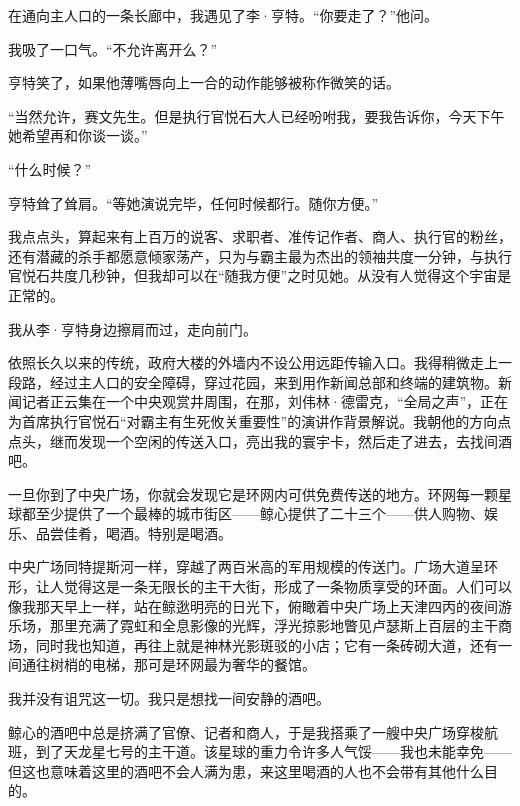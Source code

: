 \documentclass[AutoFakeBold=true]{book}
\begin{document}
\vspace*{1em}

在通向主人口的一条长廊中，我遇见了李·亨特。``你要走了？''他问。

我吸了一口气。``不允许离开么？''

亨特笑了，如果他薄嘴唇向上一合的动作能够被称作微笑的话。

``当然允许，赛文先生。但是执行官悦石大人已经吩咐我，要我告诉你，今天下午她希望再和你谈一谈。''

``什么时候？''

亨特耸了耸肩。``等她演说完毕，任何时候都行。随你方便。''

我点点头，算起来有上百万的说客、求职者、准传记作者、商人、执行官的粉丝，还有潜藏的杀手都愿意倾家荡产，只为与霸主最为杰出的领袖共度一分钟，与执行官悦石共度几秒钟，但我却可以在``随我方便''之时见她。从没有人觉得这个宇宙是正常的。

我从李·亨特身边擦肩而过，走向前门。

\vspace*{1em}

依照长久以来的传统，政府大楼的外墙内不设公用远距传输入口。我得稍微走上一段路，经过主人口的安全障碍，穿过花园，来到用作新闻总部和终端的建筑物。新闻记者正云集在一个中央观赏井周围，在那，刘伟林·德雷克，``全局之声''，正在为首席执行官悦石``对霸主有生死攸关重要性''的演讲作背景解说。我朝他的方向点点头，继而发现一个空闲的传送入口，亮出我的寰宇卡，然后走了进去，去找间酒吧。

\vspace*{1em}

一旦你到了中央广场，你就会发现它是环网内可供免费传送的地方。环网每一颗星球都至少提供了一个最棒的城市街区——鲸心提供了二十三个——供人购物、娱乐、品尝佳肴，喝酒。特别是喝酒。

中央广场同特提斯河一样，穿越了两百米高的军用规模的传送门。广场大道呈环形，让人觉得这是一条无限长的主干大街，形成了一条物质享受的环面。人们可以像我那天早上一样，站在鲸逖明亮的日光下，俯瞰着中央广场上天津四丙的夜间游乐场，那里充满了霓虹和全息影像的光辉，浮光掠影地瞥见卢瑟斯上百层的主干商场，同时我也知道，再往上就是神林光影斑驳的小店；它有一条砖砌大道，还有一间通往树梢的电梯，那可是环网最为奢华的餐馆。

我并没有诅咒这一切。我只是想找一间安静的酒吧。

鲸心的酒吧中总是挤满了官僚、记者和商人，于是我搭乘了一艘中央广场穿梭航班，到了天龙星七号的主干道。该星球的重力令许多人气馁——我也未能幸免——但这也意味着这里的酒吧不会人满为患，来这里喝酒的人也不会带有其他什么目的。
\end{document}
